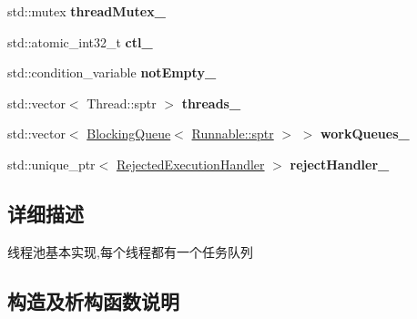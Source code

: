 \begin{DoxyCompactItemize}
\mbox{\label{classThreadPoolExecutor_af4f94013afa2ddf003b2f8ff7f7a8fad}} 
std\+::mutex {\bfseries thread\+Mutex\+\_\+}
\item 
\mbox{\label{classThreadPoolExecutor_a010113b7aac17ef364d417c485263873}} 
std\+::atomic\+\_\+int32\+\_\+t {\bfseries ctl\+\_\+}
\item 
\mbox{\label{classThreadPoolExecutor_ad523af8548ca8f1dae80cb295ee567b3}} 
std\+::condition\+\_\+variable {\bfseries not\+Empty\+\_\+}
\item 
\mbox{\label{classThreadPoolExecutor_a47dd74330fa41d01067943b1db74818a}} 
std\+::vector$<$ Thread\+::sptr $>$ {\bfseries threads\+\_\+}
\item 
\mbox{\label{classThreadPoolExecutor_a415491f8f40c0fcb99e7ec25cdd209d0}} 
std\+::vector$<$ \hyperlink{classBlockingQueue}{Blocking\+Queue}$<$ \hyperlink{classRunnable_abe8d3066c7305401d6f0aad8e70780f2}{Runnable\+::sptr} $>$ $>$ {\bfseries work\+Queues\+\_\+}
\item 
\mbox{\label{classThreadPoolExecutor_a347041db412b03aa09dd4e9b3beaa391}} 
std\+::unique\+\_\+ptr$<$ \hyperlink{classRejectedExecutionHandler}{Rejected\+Execution\+Handler} $>$ {\bfseries reject\+Handler\+\_\+}
\end{DoxyCompactItemize}


\subsection{详细描述}
线程池基本实现,每个线程都有一个任务队列 

\subsection{构造及析构函数说明}
\mbox{\label{classThreadPoolExecutor_a212b34b7e25e9eba4e096473a1b81f9e}} 
